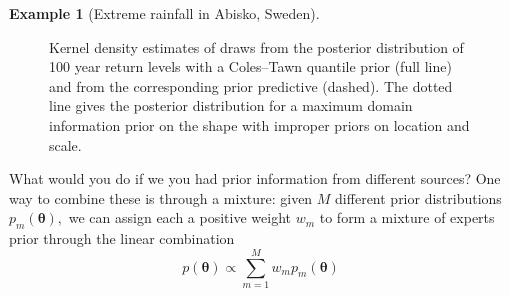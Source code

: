 \documentclass[
  11pt,
  letterpaper,
]{scrbook}
\theoremstyle{definition}
\theoremstyle{plain}
\theoremstyle{plain}
\theoremstyle{definition}
\theoremstyle{definition}
\newtheorem{example}{Example}[chapter]
\theoremstyle{remark}
\begin{document}
\begin{example}[Extreme rainfall in Abisko,
Sweden]
\begin{figure}[ht!]
{}

\caption{\label{fig-gev-colestawn-quant-prior}Kernel density estimates
of draws from the posterior distribution of 100 year return levels with
a Coles--Tawn quantile prior (full line) and from the corresponding
prior predictive (dashed). The dotted line gives the posterior
distribution for a maximum domain information prior on the shape with
improper priors on location and scale.}

\end{figure}%

\end{example}

What would you do if we you had prior information from different
sources? One way to combine these is through a mixture: given \(M\)
different prior distributions \(p_m(\boldsymbol{\theta}),\) we can
assign each a positive weight \(w_m\) to form a mixture of experts prior
through the linear combination
\[ p(\boldsymbol{\theta}) \propto \sum_{m=1}^M w_m p_m(\boldsymbol{\theta})\]
\end{document}
